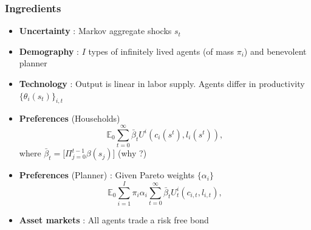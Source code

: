 \documentclass{beamer}
\begin{document}
\begin{frame}
 \frametitle{Ingredients}
 \begin{itemize}
 \item \textbf{Uncertainty }: Markov aggregate shocks $s_t$
  \item \textbf{Demography} : $I$ types of infinitely lived agents (of mass $\pi_i$)  and benevolent planner 
  \item \textbf{Technology }: Output is linear in labor supply. Agents differ in productivity $\{\theta_i(s_t)\}_{i,t}$
  \item \textbf{Preferences }(Households) 
  \begin{equation*}
\mathbb{E}_{0}\sum_{t=0}^{\infty } \bar{\beta}_t  U^{i}\left(
c_{i}(s^t),l_{i}(s^t)\right),  \label{utility lifetime}
\end{equation*}%
where $\bar{\beta}_t=\bigl[\Pi_{j=0}^{t-1}\beta(s_j)\bigr]$ (why ?)
\item \textbf{Preferences} (Planner) : Given Pareto weights $\{\alpha_i\}$
\begin{equation*}
\mathbb{E}_{0}\sum_{i=1}^{I}\pi _{i}\alpha _{i}\sum_{t=0}^{\infty }\bar{\beta}_t U_{t}^{i}\left( c_{i,t},l_{i,t}\right),  \label{govmt objective}
\end{equation*}
  \item \textbf{Asset markets} : All agents trade a risk free bond
  \end{itemize}

\end{frame}
\end{document}
